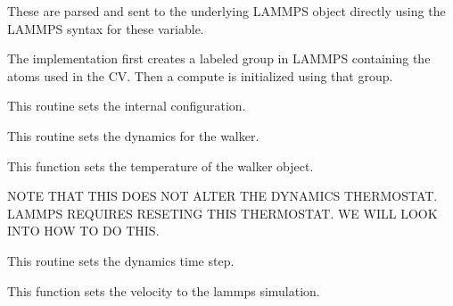 \documentclass[letterpaper,10pt,english]{sphinxmanual}
\begin{document}
\begin{fulllineitems}
\begin{fulllineitems}
\begin{itemize}
\end{itemize}

These are parsed and sent to the underlying LAMMPS object directly using the LAMMPS syntax for these variable.

The implementation first creates a labeled group in LAMMPS containing the atoms used in the CV. Then a compute is initialized using that group.

\end{fulllineitems}


\begin{fulllineitems}
\label{src/src.doc:lammpsWalker.lammpsWalker.setConfig}
This routine sets the internal configuration.

\end{fulllineitems}


\begin{fulllineitems}
\label{src/src.doc:lammpsWalker.lammpsWalker.setDynamics}
This routine sets the dynamics for the walker.

\end{fulllineitems}


\begin{fulllineitems}
\label{src/src.doc:lammpsWalker.lammpsWalker.setTemperature}
This function sets the temperature of the walker object.

NOTE THAT THIS DOES NOT ALTER THE DYNAMICS THERMOSTAT. LAMMPS REQUIRES
RESETING THIS THERMOSTAT. WE WILL LOOK INTO HOW TO DO THIS.

\end{fulllineitems}


\begin{fulllineitems}
\label{src/src.doc:lammpsWalker.lammpsWalker.setTimestep}
This routine sets the dynamics time step.

\end{fulllineitems}


\begin{fulllineitems}
\label{src/src.doc:lammpsWalker.lammpsWalker.setVel}
This function sets the velocity to the lammps simulation.

\end{fulllineitems}


\end{fulllineitems}
\end{document}
